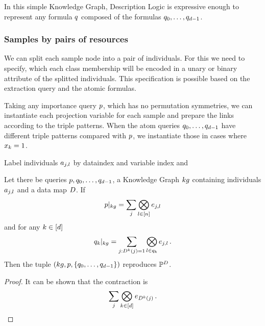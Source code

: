 % 
In this simple Knowledge Graph, Description Logic is expressive enough to represent any formula $q$ composed of the formulas $q_{0},\ldots,q_{d-1}$.






\subsubsection{Samples by pairs of resources}




\begin{remark}
	We can split each sample node into a pair of individuals.
	For this we need to specify, which each class membership will be encoded in a unary or binary attribute of the splitted individuals.
	This specification is possible based on the extraction query and the atomic formulas.
\end{remark}

% 
Taking any importance query $p$, which has no permutation symmetries, we can instantiate each projection variable for each sample and prepare the links according to the triple patterns.
When the atom queries $q_{0},\ldots,q_{d-1}$ have different triple patterns compared with $p$, we instantiate those in cases where $x_{k}=1$.


%
Label individuals $a_{j,l}$ by dataindex and variable index and

\begin{theorem}
	Let there be queries $p,q_{0},\ldots,q_{d-1}$, a Knowledge Graph $kg$ containing individuals $a_{j,l}$ and a data map $D$.
	If
		\[ {p}|_{kg} = \sum_{j} \bigotimes_{l\in[n]} e_{j,l} \]
	and for any $k\in[d]$
		\[ {q_{k}}|_{kg} 
		= \sum_{j : D^{k}(j)=1} \bigotimes_{l \in q_{k}} e_{j,l} \, . \]
	Then the tuple $(kg,p,\{q_{0},\ldots,q_{d-1}\})$ reproduces $\mathbb{P}^{D}$.
\end{theorem}
\begin{proof}
	It can be shown that the contraction is
		\[ \sum_{j} \bigotimes_{k\in[d]} e_{D^{k}(j)} \, . \]
\end{proof}


